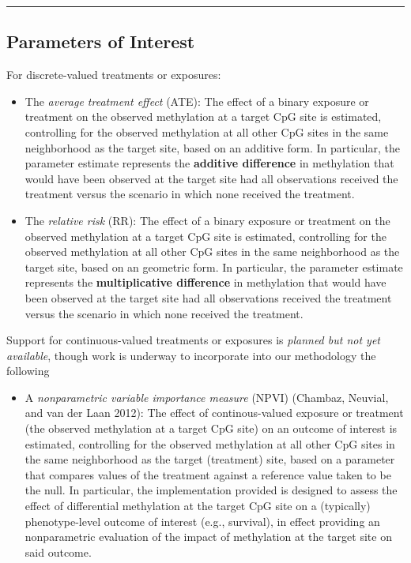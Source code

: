 \documentclass[9pt,a4paper,]{extarticle}
\theoremstyle{definition}
\theoremstyle{definition}
\theoremstyle{definition}
\theoremstyle{remark}
\begin{document}
\begin{center}\rule{0.5\linewidth}{\linethickness}\end{center}

\subsection{Parameters of Interest}\label{parameters-of-interest}

For discrete-valued treatments or exposures:

\begin{itemize}
\item
  The \emph{average treatment effect} (ATE): The effect of a binary
  exposure or treatment on the observed methylation at a target CpG site
  is estimated, controlling for the observed methylation at all other
  CpG sites in the same neighborhood as the target site, based on an
  additive form. In particular, the parameter estimate represents the
  \textbf{additive difference} in methylation that would have been
  observed at the target site had all observations received the
  treatment versus the scenario in which none received the treatment.
\item
  The \emph{relative risk} (RR): The effect of a binary exposure or
  treatment on the observed methylation at a target CpG site is
  estimated, controlling for the observed methylation at all other CpG
  sites in the same neighborhood as the target site, based on an
  geometric form. In particular, the parameter estimate represents the
  \textbf{multiplicative difference} in methylation that would have been
  observed at the target site had all observations received the
  treatment versus the scenario in which none received the treatment.
\end{itemize}

Support for continuous-valued treatments or exposures is \emph{planned
but not yet available}, though work is underway to incorporate into our
methodology the following

\begin{itemize}
\item
  A \emph{nonparametric variable importance measure} (NPVI) (Chambaz,
  Neuvial, and van der Laan 2012): The effect of continous-valued
  exposure or treatment (the observed methylation at a target CpG site)
  on an outcome of interest is estimated, controlling for the observed
  methylation at all other CpG sites in the same neighborhood as the
  target (treatment) site, based on a parameter that compares values of
  the treatment against a reference value taken to be the null. In
  particular, the implementation provided is designed to assess the
  effect of differential methylation at the target CpG site on a
  (typically) phenotype-level outcome of interest (e.g., survival), in
  effect providing an nonparametric evaluation of the impact of
  methylation at the target site on said outcome.
\end{itemize}
\end{document}
